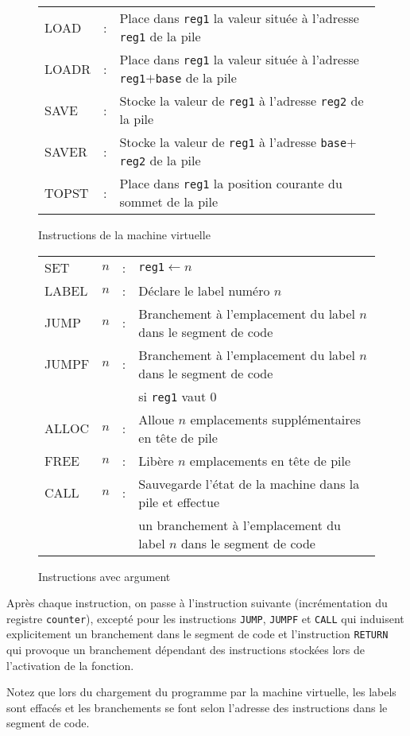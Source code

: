 \documentclass[12pt,a4paper]{article}
\begin{document}
\begin{figure}
\begin{tabular}{lll}
    LOAD &:& Place dans {\tt reg1} la valeur située à l'adresse {\tt reg1}
    de la pile\\
    LOADR &:& Place dans {\tt reg1} la valeur située à l'adresse
    {\tt reg1}$+${\tt base} de la pile\\
    SAVE &:& Stocke la valeur de {\tt reg1} à l'adresse {\tt reg2} de la pile\\
    SAVER&:& Stocke la valeur de {\tt reg1} à l'adresse {\tt base}$+${\tt reg2} de la pile\\
    TOPST &:& Place dans {\tt reg1} la position courante du sommet de la pile
  \end{tabular}
  
  \caption{Instructions de la machine virtuelle}
  \label{fig:instruct}
\end{figure}

\begin{figure}
  \centering
  \begin{tabular}{llll}
    SET   &$n$&:& {\tt reg1}$\leftarrow n$\\
    LABEL &$n$&:& Déclare le label numéro $n$\\
    JUMP  &$n$&:& Branchement à l'emplacement du label $n$ dans le segment de code\\
    JUMPF &$n$&:& Branchement à l'emplacement du label $n$ dans le segment de code\\
    &&& si {\tt reg1} vaut $0$\\
    ALLOC &$n$&:& Alloue $n$ emplacements supplémentaires en tête de
    pile\\
    FREE  &$n$&:& Libère $n$ emplacements en tête de pile\\
    CALL  &$n$&:& Sauvegarde l'état de la machine dans la pile et effectue \\
    &&& un branchement à l'emplacement du label $n$ dans le segment de code\\
  \end{tabular}
  \caption{Instructions avec argument}
\label{fig:instructarg}
\end{figure}

Après chaque instruction, on passe à l'instruction suivante
(incrémentation du registre {\tt counter}), excepté
pour les instructions {\tt JUMP}, {\tt JUMPF} et {\tt CALL} qui
induisent explicitement un branchement dans le segment de code
et l'instruction {\tt RETURN} qui provoque un branchement dépendant
des instructions stockées lors de l'activation de la fonction.

Notez que lors du chargement du programme par la machine virtuelle,
les labels sont effacés et les branchements se font selon l'adresse
des instructions dans le segment de code.
\end{document}
